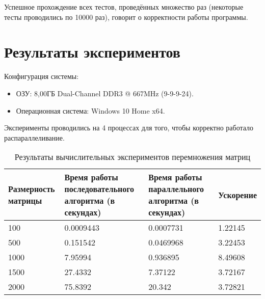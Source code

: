 \documentclass[12pt, letterpaper]{article}
\begin{document}
Успешное прохождение всех тестов, проведённых множество раз (некоторые тесты проводились по 10000 раз), говорит о корректности работы программы.
\newpage

\section*{Результаты экспериментов}
\par  Конфигурация системы: 
\begin{itemize}
    : Intel Core i5-3340  3,30 GHz; Количество ядер: 4; Количество потоков 4.
    \item ОЗУ: 8,00ГБ Dual-Channel DDR3 @ 667MHz (9-9-9-24).
    \item Операционная система: Windows 10 Home x64.
\end{itemize}

Эксперименты проводились на 4 процессах для того, чтобы корректно работало распараллеливание.

\begin{table}[!h]
\caption{Результаты вычислительных экспериментов перемножения матриц}
\centering
\begin{tabular}{| p{3cm} | p{5cm} | p{5cm} | p{2cm} |}
\hline
Размерность матрицы & Время работы последовательного алгоритма (в секундах) & Время работы параллельного алгоритма (в секундах) & Ускорение  \\[5pt]
\hline
100        & 0.0009443        & 0.0007731     & 1.22145       \\
500        & 0.151542        & 0.0469968     &  3.22453       \\
1000       & 7.95994        & 0.936895     & 8.49608       \\
1500       &  27.4332        & 7.37122     & 3.72167      \\
2000       & 75.8392       & 20.342     & 3.72821       \\
\hline
\end{tabular}
\end{table}
\newpage
\end{document}
